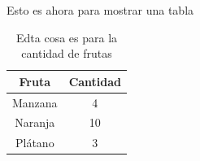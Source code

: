 \documentclass{article}
\begin{document}
  Esto es ahora para mostrar una tabla

  \begin{table}[t]
    \begin{center}
      \begin{tabular}{| c | c |}
        \hline
        Fruta & Cantidad \\ \hline
        Manzana & 4 \\
        Naranja & 10 \\
        Plátano & 3 \\ \hline
      \end{tabular}
      \caption{Edta cosa es para la cantidad de frutas}
      \label{tab:prrof}
    \end{center}
  \end{table}
\end{document}
